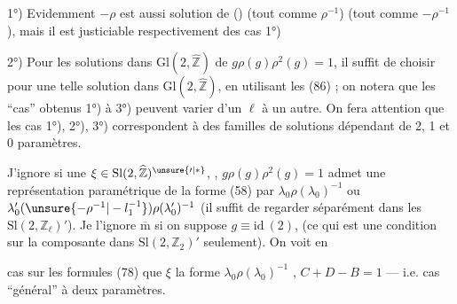 

  1°) Evidemment $-\rho$ est aussi solution de ()
(tout comme $\rho^{-1}$) 
(tout comme $-\rho^{-1}$), mais il est justiciable
respectivement des cas  1°) 

2°) Pour  les solutions dans $\mathrm{Gl}(2,\widehat{\mathbb Z})$
de $g\rho(g)\rho^2(g)=1$, il suffit de choisir pour
\unsure{$\forall\,\ell$} une telle solution dans $\mathrm{Gl}(2,\widehat{\mathbb Z})$, en
utilisant les  (86) ; on notera que
les ``cas'' obtenus 1°) à 3°) peuvent varier d'un
$\ell$ à un autre. 
On fera attention que les cas 1°), 2°), 3°)
correspondent  à des familles de
solutions dépendant de 2, 1 et 0 paramètres.

 J'ignore si une $\xi\in\mathrm{Sl}(2,\widehat{\mathbb Z})^{\unsure{\prime|*}}$, , 
$g\rho(g)\rho^2(g)=1$ admet une représentation
paramétrique de la forme (58)
par $\lambda_0\rho(\lambda_0)^{-1}$ ou $\lambda'_0(\unsure{-\rho^{-1}|-l_1^{-1}})\rho(\lambda'_0)^{-1}$
(il suffit
de regarder séparément dans les $\mathrm{Sl}(2,\mathbb Z_\ell)'$).
Je l'ignore $\overline{\mathrm m}$ si on suppose $g\equiv\mathrm{id}\ (2)$,
(ce qui est une condition sur la composante
dans $\mathrm{Sl}(2,\mathbb Z_2)'$ seulement). On voit en



 cas sur les formules (78) que  $\xi$
 la forme $\lambda_0\rho(\lambda_0)^{-1}$
,
 
 $C+D-B=1$ --- i.e. 
 cas ``général'' à deux paramètres.

